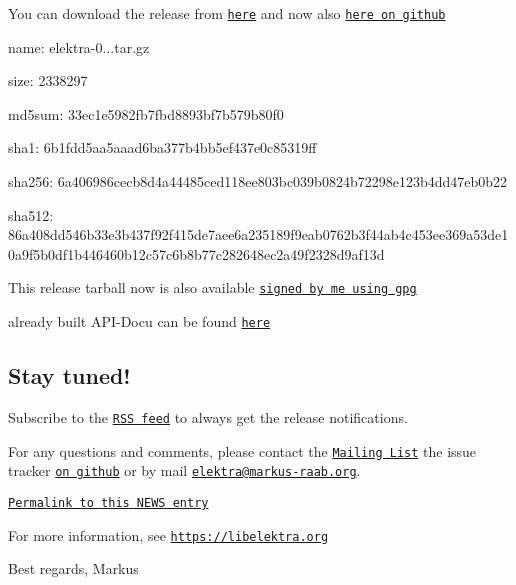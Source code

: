 You can download the release from \href{https://www.libelektra.org/ftp/elektra/releases/elektra-0.8.15.tar.gz}{\tt here} and now also \href{https://github.com/ElektraInitiative/ftp/tree/master/releases/elektra-0.8.15.tar.gz}{\tt here on github}


\begin{DoxyItemize}
\item name\+: elektra-\/0...\+tar.\+gz
\item size\+: 2338297
\item md5sum\+: 33ec1e5982fb7fbd8893bf7b579b80f0
\item sha1\+: 6b1fdd5aa5aaad6ba377b4bb5ef437e0c85319ff
\item sha256\+: 6a406986cecb8d4a44485ced118ee803bc039b0824b72298e123b4dd47eb0b22
\item sha512\+: 86a408dd546b33e3b437f92f415de7aee6a235189f9eab0762b3f44ab4c453ee369a53de10a9f5b0df1b446460b12c57c6b8b77c282648ec2a49f2328d9af13d
\end{DoxyItemize}

This release tarball now is also available \href{https://www.libelektra.org/ftp/elektra/releases/elektra-0.8.15.tar.gz.gpg}{\tt signed by me using gpg}

already built A\+P\+I-\/\+Docu can be found \href{https://doc.libelektra.org/api/0.8.15/html/}{\tt here}

\subsection*{Stay tuned!}

Subscribe to the \href{https://doc.libelektra.org/news/feed.rss}{\tt R\+SS feed} to always get the release notifications.

For any questions and comments, please contact the \href{https://lists.sourceforge.net/lists/listinfo/registry-list}{\tt Mailing List} the issue tracker \href{https://git.libelektra.org/issues}{\tt on github} or by mail \href{mailto:elektra@markus-raab.org}{\tt elektra@markus-\/raab.\+org}.

\href{https://doc.libelektra.org/news/1ab4a560-c286-46d2-a058-1a8e7e208fe8.html}{\tt Permalink to this N\+E\+WS entry}

For more information, see \href{https://libelektra.org}{\tt https\+://libelektra.\+org}

Best regards, Markus 